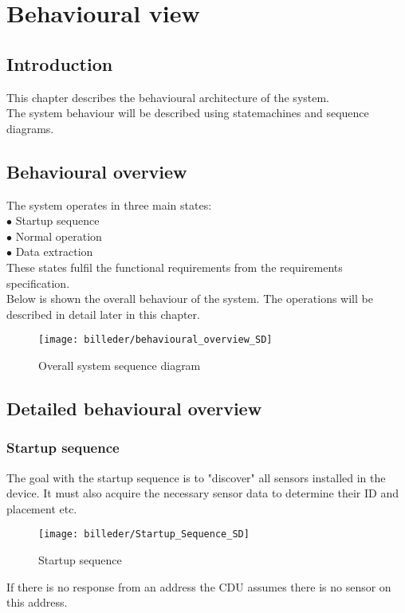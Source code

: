 \chapter{Behavioural view}

\section{Introduction}
This chapter describes the behavioural architecture of the system.\\
The system behaviour will be described using statemachines and sequence diagrams.\\

\section{Behavioural overview}
The system operates in three main states:\\
$\bullet$ Startup sequence\\
$\bullet$ Normal operation\\
$\bullet$ Data extraction\\
These states fulfil the functional requirements from the requirements specification.\\
Below is shown the overall behaviour of the system. The operations will be described in detail later in this chapter.
\begin{figure}
\centering
\texttt{[image: billeder/behavioural\_overview\_SD]}
\caption{Overall system sequence diagram}
\end{figure}

\section{Detailed behavioural overview}

\subsection{Startup sequence}
The goal with the startup sequence is to "discover" all sensors installed in the device. It must also acquire the necessary sensor data to determine their ID and placement etc.\\

\begin{figure}[hbpt]
\centering
\texttt{[image: billeder/Startup\_Sequence\_SD]}
\caption{Startup sequence}
\end{figure}
If there is no response from an address the CDU assumes there is no sensor on this address.

